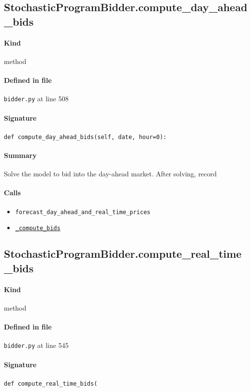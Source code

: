 \documentclass[11pt]{report}
\begin{document}
\subsection{StochasticProgramBidder.compute\_day\_ahead\_bids}
\label{def:bidder.py:StochasticProgramBidder.compute_day_ahead_bids:L508}
\paragraph{Kind} method
\paragraph{Defined in file} \texttt{bidder.py} at line 508
\paragraph{Signature} \texttt{def compute\_day\_ahead\_bids(self, date, hour=0):}
\paragraph{Summary} Solve the model to bid into the day-ahead market. After solving, record
\paragraph{Calls}
\begin{itemize}[leftmargin=*]
  \item \texttt{forecast\_day\_ahead\_and\_real\_time\_prices}
  \item \hyperref[def:bidder.py:StochasticProgramBidder._compute_bids:L456]{\texttt{\_compute\_bids}}
\end{itemize}
\subsection{StochasticProgramBidder.compute\_real\_time\_bids}
\label{def:bidder.py:StochasticProgramBidder.compute_real_time_bids:L545}
\paragraph{Kind} method
\paragraph{Defined in file} \texttt{bidder.py} at line 545
\paragraph{Signature} \texttt{def compute\_real\_time\_bids(}
\end{document}
